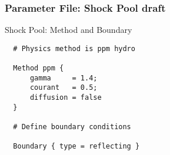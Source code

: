     \begin{frame}[fragile] \frametitle{Parameter File: Shock Pool draft}
 \footnotesize
\begin{block}{Shock Pool: Method and Boundary}
      \begin{verbatim}
  # Physics method is ppm hydro
 
  Method ppm {
      gamma     = 1.4;
      courant   = 0.5;
      diffusion = false
  }
 
  # Define boundary conditions
 
  Boundary { type = reflecting }
      \end{verbatim}
\end{block}
\end{frame}
